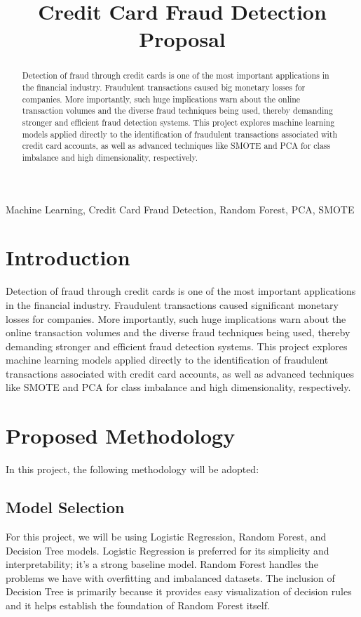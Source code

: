 \documentclass[journal]{IEEEtran}
\title{Credit Card Fraud Detection Proposal}
\author{
    \IEEEauthorblockN{Şenol Erdem, Student ID: 14416706852}
    \IEEEauthorblockA{\textit{Department of Computer Engineering}, \texttt{senolerdem@ogr.eskisehir.edu.tr}}
    \and
    \IEEEauthorblockN{Duran Özçelik, Student ID: 14128544032}
    \IEEEauthorblockA{\textit{Department of Computer Engineering}, \texttt{duran_ozcelik@ogr.eskisehir.edu.tr}}
}
\begin{document}
\maketitle
\begin{abstract}
Detection of fraud through credit cards is one of the most important applications in the financial industry. Fraudulent transactions caused big monetary losses for companies. More importantly, such huge implications warn about the online transaction volumes and the diverse fraud techniques being used, thereby demanding stronger and efficient fraud detection systems. This project explores machine learning models applied directly to the identification of fraudulent transactions associated with credit card accounts, as well as advanced techniques like SMOTE and PCA for class imbalance and high dimensionality, respectively.
\end{abstract}

\begin{IEEEkeywords}
Machine Learning, Credit Card Fraud Detection, Random Forest, PCA, SMOTE
\end{IEEEkeywords}

\section{Introduction}
Detection of fraud through credit cards is one of the most important applications in the financial industry. Fraudulent transactions caused significant monetary losses for companies. More importantly, such huge implications warn about the online transaction volumes and the diverse fraud techniques being used, thereby demanding stronger and efficient fraud detection systems. This project explores machine learning models applied directly to the identification of fraudulent transactions associated with credit card accounts, as well as advanced techniques like SMOTE and PCA for class imbalance and high dimensionality, respectively.

\section{Proposed Methodology}
In this project, the following methodology will be adopted:

\subsection{Model Selection}
For this project, we will be using Logistic Regression, Random Forest, and Decision Tree models. Logistic Regression is preferred for its simplicity and interpretability; it's a strong baseline model. Random Forest handles the problems we have with overfitting and imbalanced datasets. The inclusion of Decision Tree is primarily because it provides easy visualization of decision rules and it helps establish the foundation of Random Forest itself.
\end{document}
